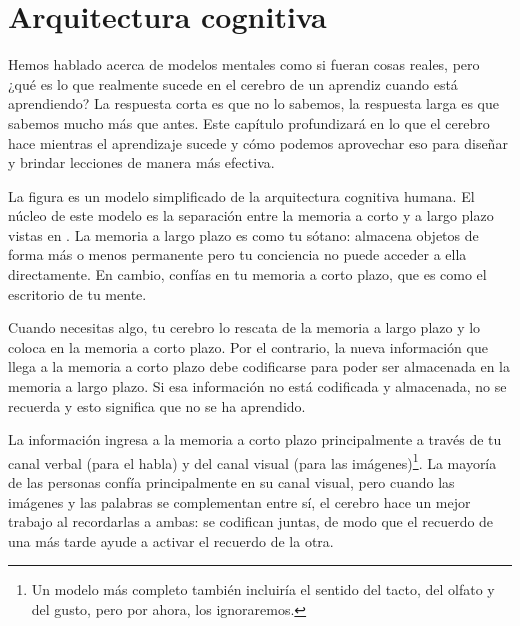 \chapter{Arquitectura cognitiva}\label{s:architecture}

Hemos hablado acerca de modelos mentales como si fueran cosas reales, 
pero ¿qué es lo que realmente sucede en el cerebro de un aprendiz cuando está aprendiendo? 
La respuesta corta es que no lo sabemos, la respuesta larga es que sabemos mucho más que antes.
Este capítulo profundizará en lo que el cerebro hace mientras el aprendizaje sucede 
y cómo podemos aprovechar eso para diseñar y brindar lecciones de manera más efectiva.



La figura  es un modelo simplificado de la arquitectura cognitiva humana.
El núcleo de este modelo es la separación entre la memoria a corto y a largo plazo vistas en .
La memoria a largo plazo es como tu sótano:
almacena objetos de forma más o menos permanente 
pero tu conciencia no puede acceder a ella directamente. 
En cambio, 
confías en tu memoria a corto plazo,
que es como el escritorio de tu mente.

Cuando necesitas algo, 
tu cerebro lo rescata de la memoria a largo plazo  
y lo coloca en la memoria a corto plazo. 
Por el contrario, la nueva información que llega a la memoria a corto plazo 
debe codificarse para poder ser almacenada en la memoria a largo plazo.
Si esa información no está codificada y almacenada, no se recuerda y esto significa que  
no se ha aprendido.

La información ingresa a la memoria a corto plazo principalmente 
a través de tu canal verbal (para el habla)
y del canal visual
(para las imágenes)\footnote{
  Un modelo más completo
  también incluiría el sentido del tacto, del olfato y del gusto,
  pero por ahora, los ignoraremos.}.
La mayoría de las personas confía principalmente en su canal visual, 
pero cuando las imágenes y las palabras se complementan entre sí,
el cerebro hace un mejor trabajo al recordarlas a ambas: 
se codifican juntas,
de modo que el recuerdo de una más tarde ayude a activar el recuerdo de la otra.

